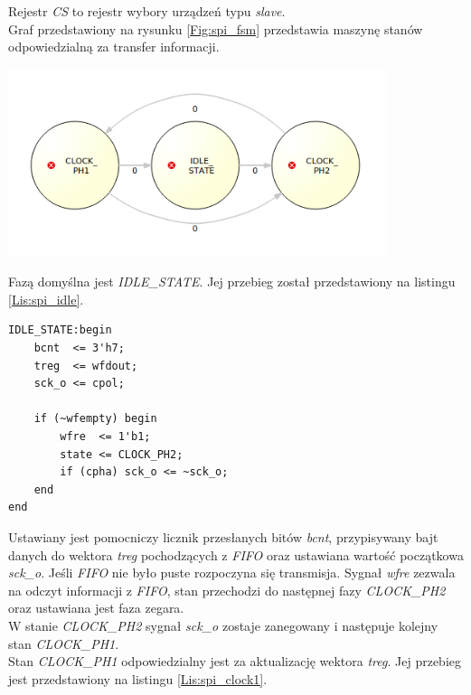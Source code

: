 \documentclass[11pt,a4paper]{article}
\begin{document}
Rejestr \textit{CS} to rejestr wybory urządzeń typu \textit{slave}. \\
Graf przedstawiony na rysunku \ref{Fig:spi_fsm} przedstawia maszynę stanów odpowiedzialną za transfer informacji. \\

					\begin{minipage}[c]{\textwidth}

					\includegraphics[width=\textwidth,height=5.5cm]{./rysunki/fsm_spi.png}
			\end{minipage} 
			 Fazą domyślna jest \textit{IDLE\_STATE}. Jej przebieg został przedstawiony na listingu \ref{Lis:spi_idle}.\\
			 \begin{minipage}{\textwidth}
\begin{scriptsize}
\begin{lstlisting}[label=Lis:spi_idle,caption=Faza \textit{IDLE\_STATE}]
IDLE_STATE:begin 
	bcnt  <= 3'h7;   
	treg  <= wfdout; 
	sck_o <= cpol;   

	if (~wfempty) begin
		wfre  <= 1'b1;
		state <= CLOCK_PH2;
		if (cpha) sck_o <= ~sck_o;
	end
end
\end{lstlisting}
\end{scriptsize}
\end{minipage}	
Ustawiany jest pomocniczy licznik przesłanych bitów \textit{bcnt}, przypisywany bajt danych do wektora \textit{treg} pochodzących z \textit{FIFO} oraz ustawiana wartość początkowa \textit{sck\_o}. Jeśli \textit{FIFO} nie było puste rozpoczyna się transmisja. Sygnał \textit{wfre} zezwala na odczyt informacji z \textit{FIFO}, stan przechodzi do następnej fazy \textit{CLOCK\_PH2} oraz ustawiana jest faza zegara. \\
W stanie \textit{CLOCK\_PH2} sygnał \textit{sck\_o} zostaje zanegowany i następuje kolejny stan \textit{CLOCK\_PH1}. \\
 Stan \textit{CLOCK\_PH1} odpowiedzialny jest za aktualizację wektora \textit{treg}. Jej przebieg jest przedstawiony na listingu \ref{Lis:spi_clock1}.\\
\end{document}
